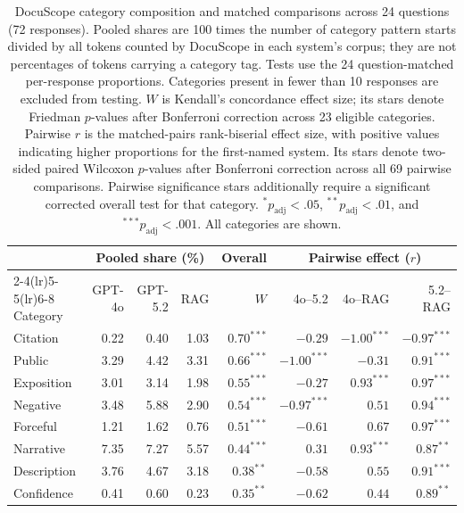 \begin{table}[tbp]
\centering
\caption{DocuScope category composition and matched comparisons across 24 questions (72 responses). Pooled shares are 100 times the number of category pattern starts divided by all tokens counted by DocuScope in each system's corpus; they are not percentages of tokens carrying a category tag. Tests use the 24 question-matched per-response proportions. Categories present in fewer than 10 responses are excluded from testing. $W$ is Kendall's concordance effect size; its stars denote Friedman $p$-values after Bonferroni correction across 23 eligible categories. Pairwise $r$ is the matched-pairs rank-biserial effect size, with positive values indicating higher proportions for the first-named system. Its stars denote two-sided paired Wilcoxon $p$-values after Bonferroni correction across all 69 pairwise comparisons. Pairwise significance stars additionally require a significant corrected overall test for that category. $^{*}p_{\mathrm{adj}}<.05$, $^{**}p_{\mathrm{adj}}<.01$, and $^{***}p_{\mathrm{adj}}<.001$. All categories are shown.}
\label{tab:docuscope}
\small
\setlength{\tabcolsep}{4pt}
\begin{tabular}{lrrrrrrr}
\toprule
 & \multicolumn{3}{c}{Pooled share (\%)} & \multicolumn{1}{c}{Overall} & \multicolumn{3}{c}{Pairwise effect ($r$)} \\
\cmidrule(lr){2-4}\cmidrule(lr){5-5}\cmidrule(lr){6-8}
Category & GPT-4o & GPT-5.2 & RAG & $W$ & 4o--5.2 & 4o--RAG & 5.2--RAG \\
\midrule
Citation & 0.22 & 0.40 & 1.03 & $0.70^{***}$ & $-0.29$ & $-1.00^{***}$ & $-0.97^{***}$ \\
Public & 3.29 & 4.42 & 3.31 & $0.66^{***}$ & $-1.00^{***}$ & $-0.31$ & $0.91^{***}$ \\
Exposition & 3.01 & 3.14 & 1.98 & $0.55^{***}$ & $-0.27$ & $0.93^{***}$ & $0.97^{***}$ \\
Negative & 3.48 & 5.88 & 2.90 & $0.54^{***}$ & $-0.97^{***}$ & $0.51$ & $0.94^{***}$ \\
Forceful & 1.21 & 1.62 & 0.76 & $0.51^{***}$ & $-0.61$ & $0.67$ & $0.97^{***}$ \\
Narrative & 7.35 & 7.27 & 5.57 & $0.44^{***}$ & $0.31$ & $0.93^{***}$ & $0.87^{**}$ \\
Description & 3.76 & 4.67 & 3.18 & $0.38^{**}$ & $-0.58$ & $0.55$ & $0.91^{***}$ \\
Confidence & 0.41 & 0.60 & 0.23 & $0.35^{**}$ & $-0.62$ & $0.44$ & $0.89^{**}$ \\

\end{tabular}
\end{table}
